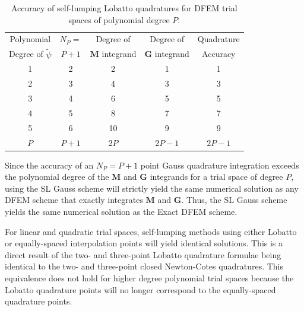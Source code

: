 %
%
\begin{table}[!htp]
\centering
\caption{Accuracy of self-lumping Lobatto quadratures for DFEM trial spaces of polynomial degree $P$.}
\begin{tabular}{|c|c|c|c|c|} 
\hline
  Polynomial 											& $N_P=$		  & Degree of   					 &  Degree of   					&  Quadrature  \\
  Degree  of $\widetilde{\psi}$		& $P+1$		 		& $\mathbf{M}$ integrand & $\mathbf{G}$ integrand &  Accuracy  \\
	\hline
				1   											&   2   		&   2   								&		1									        &				1				  \\ 		\hline
				2   											&   3   		&    4  								&			3						            &				3		      \\		\hline
				3   											&   4   		&   6   								&			5 					            &				5		      \\		\hline
				4   											&   5   		&   8   								&			7 				              &				7					\\		\hline
				5   											&   6   		&    10  								&			9										    &				9					\\		\hline
				$P$  										 &   $P+1$   &   $2P$   							&	 $2P-1$						          &		$2P - 1$						\\ \hline
\end{tabular}
\label{tbl:int_acc_lobatto} 
\end{table}
%

Since the accuracy of an $N_P=P+1$ point Gauss quadrature integration exceeds the polynomial degree of the $\mathbf{M}$ and $\mathbf{G}$ integrands for a trial space of degree $P$, using the SL Gauss scheme will strictly yield the same numerical solution as any DFEM scheme that exactly integrates $\mathbf{M}$ and $\mathbf{G}$.
Thus, the SL Gauss scheme yields the same numerical solution as the Exact DFEM scheme.
%

For linear and quadratic trial spaces, self-lumping methods using either Lobatto or equally-spaced interpolation points will yield identical solutions.  
This is a direct result of the two- and three-point Lobatto quadrature formulae being identical to the two- and three-point closed Newton-Cotes quadratures.
This equivalence does not hold for higher degree polynomial trial spaces because the Lobatto quadrature points will no longer correspond to the equally-spaced quadrature points.

